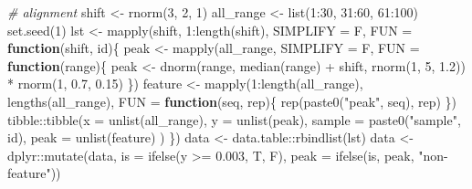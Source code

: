 \documentclass[
]{article}
\newenvironment{Shaded}{\begin{snugshade}}{\end{snugshade}}
\newcommand{\AttributeTok}[1]{\textcolor[rgb]{0.77,0.63,0.00}{#1}}
\newcommand{\CommentTok}[1]{\textcolor[rgb]{0.56,0.35,0.01}{\textit{#1}}}
\newcommand{\ControlFlowTok}[1]{\textcolor[rgb]{0.13,0.29,0.53}{\textbf{#1}}}
\newcommand{\DecValTok}[1]{\textcolor[rgb]{0.00,0.00,0.81}{#1}}
\newcommand{\FloatTok}[1]{\textcolor[rgb]{0.00,0.00,0.81}{#1}}
\newcommand{\FunctionTok}[1]{\textcolor[rgb]{0.00,0.00,0.00}{#1}}
\newcommand{\NormalTok}[1]{#1}
\newcommand{\OtherTok}[1]{\textcolor[rgb]{0.56,0.35,0.01}{#1}}
\newcommand{\SpecialCharTok}[1]{\textcolor[rgb]{0.00,0.00,0.00}{#1}}
\newcommand{\StringTok}[1]{\textcolor[rgb]{0.31,0.60,0.02}{#1}}
\begin{document}
\begin{Shaded}
\begin{Highlighting}[]
\CommentTok{\# alignment}
\NormalTok{shift }\OtherTok{\textless{}{-}} \FunctionTok{rnorm}\NormalTok{(}\DecValTok{3}\NormalTok{, }\DecValTok{2}\NormalTok{, }\DecValTok{1}\NormalTok{)}
\NormalTok{all\_range }\OtherTok{\textless{}{-}} \FunctionTok{list}\NormalTok{(}\DecValTok{1}\SpecialCharTok{:}\DecValTok{30}\NormalTok{, }\DecValTok{31}\SpecialCharTok{:}\DecValTok{60}\NormalTok{, }\DecValTok{61}\SpecialCharTok{:}\DecValTok{100}\NormalTok{)}
\FunctionTok{set.seed}\NormalTok{(}\DecValTok{1}\NormalTok{)}
\NormalTok{lst }\OtherTok{\textless{}{-}} \FunctionTok{mapply}\NormalTok{(shift, }\DecValTok{1}\SpecialCharTok{:}\FunctionTok{length}\NormalTok{(shift), }\AttributeTok{SIMPLIFY =}\NormalTok{ F, }\AttributeTok{FUN =} \ControlFlowTok{function}\NormalTok{(shift, id)\{}
\NormalTok{  peak }\OtherTok{\textless{}{-}} \FunctionTok{mapply}\NormalTok{(all\_range, }\AttributeTok{SIMPLIFY =}\NormalTok{ F,}
    \AttributeTok{FUN =} \ControlFlowTok{function}\NormalTok{(range)\{}
\NormalTok{      peak }\OtherTok{\textless{}{-}} \FunctionTok{dnorm}\NormalTok{(range, }\FunctionTok{median}\NormalTok{(range) }\SpecialCharTok{+}\NormalTok{ shift, }\FunctionTok{rnorm}\NormalTok{(}\DecValTok{1}\NormalTok{, }\DecValTok{5}\NormalTok{, }\FloatTok{1.2}\NormalTok{)) }\SpecialCharTok{*}
        \FunctionTok{rnorm}\NormalTok{(}\DecValTok{1}\NormalTok{, }\FloatTok{0.7}\NormalTok{, }\FloatTok{0.15}\NormalTok{)}
\NormalTok{    \})}
\NormalTok{  feature }\OtherTok{\textless{}{-}} \FunctionTok{mapply}\NormalTok{(}\DecValTok{1}\SpecialCharTok{:}\FunctionTok{length}\NormalTok{(all\_range), }\FunctionTok{lengths}\NormalTok{(all\_range),}
    \AttributeTok{FUN =} \ControlFlowTok{function}\NormalTok{(seq, rep)\{}
      \FunctionTok{rep}\NormalTok{(}\FunctionTok{paste0}\NormalTok{(}\StringTok{"peak"}\NormalTok{, seq), rep)}
\NormalTok{    \})}
\NormalTok{  tibble}\SpecialCharTok{::}\FunctionTok{tibble}\NormalTok{(}\AttributeTok{x =} \FunctionTok{unlist}\NormalTok{(all\_range), }\AttributeTok{y =} \FunctionTok{unlist}\NormalTok{(peak),}
    \AttributeTok{sample =} \FunctionTok{paste0}\NormalTok{(}\StringTok{"sample"}\NormalTok{, id),}
    \AttributeTok{peak =} \FunctionTok{unlist}\NormalTok{(feature)}
\NormalTok{  )}
\NormalTok{\})}
\NormalTok{data }\OtherTok{\textless{}{-}}\NormalTok{ data.table}\SpecialCharTok{::}\FunctionTok{rbindlist}\NormalTok{(lst)}
\NormalTok{data }\OtherTok{\textless{}{-}}\NormalTok{ dplyr}\SpecialCharTok{::}\FunctionTok{mutate}\NormalTok{(data,}
  \AttributeTok{is =} \FunctionTok{ifelse}\NormalTok{(y }\SpecialCharTok{\textgreater{}=} \FloatTok{0.003}\NormalTok{, T, F),}
  \AttributeTok{peak =} \FunctionTok{ifelse}\NormalTok{(is, peak, }\StringTok{"non{-}feature"}\NormalTok{))}

\end{Highlighting}
\end{Shaded}
\end{document}
